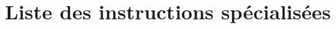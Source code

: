 \documentclass[../main.tex]{subfiles}
\begin{document}
\section*{Liste des instructions spécialisées} 
\label{Annexes}

\end{document}
